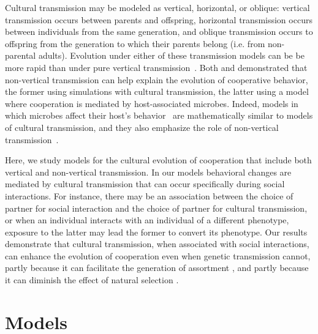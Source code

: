 \documentclass[12pt]{extarticle}
\begin{document}
Cultural transmission may be  modeled as vertical, horizontal, or oblique:  vertical transmission occurs between parents and offspring, horizontal transmission occurs between individuals from the same generation, and oblique transmission occurs  to offspring from the generation to which their parents belong (i.e. from non-parental adults). 
Evolution under either of these transmission models can be be more rapid than under pure vertical transmission~\citep{cavalli1981cultural,lycett2008questions,ram2018evolution}.
Both \citet{woodcock2006significance} and \citet{lewin2017microbes} demonstrated that non-vertical transmission can help explain the evolution of cooperative behavior, the former using simulations with cultural transmission, the latter using a model where cooperation is mediated by host-associated microbes.
Indeed, models in which microbes affect their host's behavior~\citep{lewin2017microbes,lewin2020rockpaperscissors,gurevich2020parental} are mathematically similar to models of cultural transmission, and they also emphasize the role of non-vertical transmission~\citep{cavalli1981cultural}.

Here, we study models for the cultural evolution of cooperation that include both vertical and non-vertical transmission. 
In our models behavioral changes are mediated by cultural transmission that can occur specifically during social interactions.
For instance, there may be an association between the choice of partner for social interaction and the choice of partner for cultural transmission,
or when an individual interacts with an individual of a different phenotype,  exposure to the latter may lead the former to  convert its phenotype.
Our results demonstrate that cultural transmission, when associated with social interactions, can enhance the evolution of cooperation even when genetic transmission cannot, partly because it can facilitate the generation of assortment \citep{Fletcher2009assortment}, and partly because it can diminish the effect of natural selection \citep{ram2018evolution}.


\section*{Models}
\end{document}
